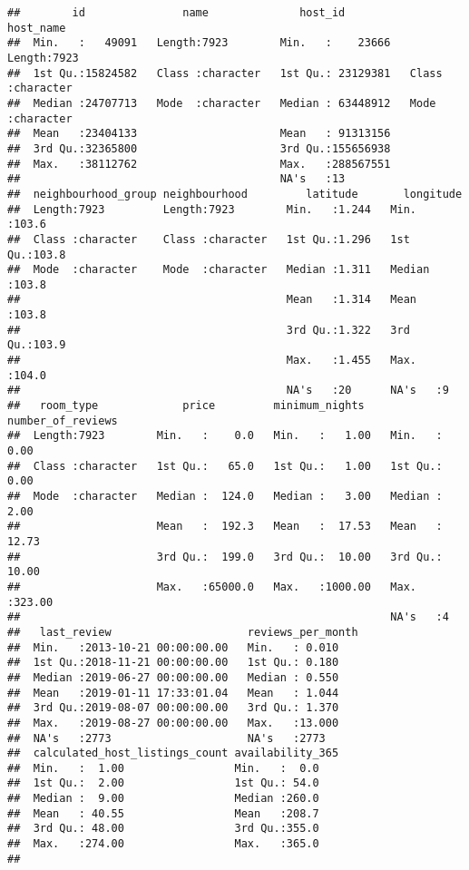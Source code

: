 \documentclass[
]{article}
\begin{document}
\begin{verbatim}
##        id               name              host_id           host_name        
##  Min.   :   49091   Length:7923        Min.   :    23666   Length:7923       
##  1st Qu.:15824582   Class :character   1st Qu.: 23129381   Class :character  
##  Median :24707713   Mode  :character   Median : 63448912   Mode  :character  
##  Mean   :23404133                      Mean   : 91313156                     
##  3rd Qu.:32365800                      3rd Qu.:155656938                     
##  Max.   :38112762                      Max.   :288567551                     
##                                        NA's   :13                            
##  neighbourhood_group neighbourhood         latitude       longitude    
##  Length:7923         Length:7923        Min.   :1.244   Min.   :103.6  
##  Class :character    Class :character   1st Qu.:1.296   1st Qu.:103.8  
##  Mode  :character    Mode  :character   Median :1.311   Median :103.8  
##                                         Mean   :1.314   Mean   :103.8  
##                                         3rd Qu.:1.322   3rd Qu.:103.9  
##                                         Max.   :1.455   Max.   :104.0  
##                                         NA's   :20      NA's   :9      
##   room_type             price         minimum_nights    number_of_reviews
##  Length:7923        Min.   :    0.0   Min.   :   1.00   Min.   :  0.00   
##  Class :character   1st Qu.:   65.0   1st Qu.:   1.00   1st Qu.:  0.00   
##  Mode  :character   Median :  124.0   Median :   3.00   Median :  2.00   
##                     Mean   :  192.3   Mean   :  17.53   Mean   : 12.73   
##                     3rd Qu.:  199.0   3rd Qu.:  10.00   3rd Qu.: 10.00   
##                     Max.   :65000.0   Max.   :1000.00   Max.   :323.00   
##                                                         NA's   :4        
##   last_review                     reviews_per_month
##  Min.   :2013-10-21 00:00:00.00   Min.   : 0.010   
##  1st Qu.:2018-11-21 00:00:00.00   1st Qu.: 0.180   
##  Median :2019-06-27 00:00:00.00   Median : 0.550   
##  Mean   :2019-01-11 17:33:01.04   Mean   : 1.044   
##  3rd Qu.:2019-08-07 00:00:00.00   3rd Qu.: 1.370   
##  Max.   :2019-08-27 00:00:00.00   Max.   :13.000   
##  NA's   :2773                     NA's   :2773     
##  calculated_host_listings_count availability_365
##  Min.   :  1.00                 Min.   :  0.0   
##  1st Qu.:  2.00                 1st Qu.: 54.0   
##  Median :  9.00                 Median :260.0   
##  Mean   : 40.55                 Mean   :208.7   
##  3rd Qu.: 48.00                 3rd Qu.:355.0   
##  Max.   :274.00                 Max.   :365.0   
## 
\end{verbatim}
\end{document}
